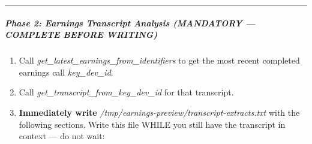 \documentclass[11pt]{article}
\begin{document}
\vspace{0.5em}\hrule\vspace{0.5em}

\subparagraph{Phase 2: Earnings Transcript Analysis (MANDATORY — COMPLETE BEFORE WRITING)}\mbox{}\par

\begin{enumerate}[leftmargin=*,itemsep=2pt,topsep=2pt]
\item {} Call \emph{get\_\allowbreak{}latest\_\allowbreak{}earnings\_\allowbreak{}from\_\allowbreak{}identifiers} to get the most recent completed earnings call \emph{key\_\allowbreak{}dev\_\allowbreak{}id}.
\item {} Call \emph{get\_\allowbreak{}transcript\_\allowbreak{}from\_\allowbreak{}key\_\allowbreak{}dev\_\allowbreak{}id} for that transcript.
\item {} \textbf{Immediately write} \emph{/tmp/earnings-preview/transcript-extracts.txt} with the following sections. Write this file WHILE you still have the transcript in context — do not wait:
\end{enumerate}
\end{document}
